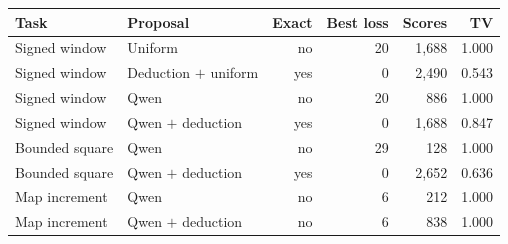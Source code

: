 \begin{tabular}{llrrrr}
\toprule
Task & Proposal & Exact & Best loss & Scores & TV \\
\midrule
Signed window & Uniform & no & 20 & 1,688 & 1.000 \\
Signed window & Deduction $+$ uniform & yes & 0 & 2,490 & 0.543 \\
Signed window & Qwen & no & 20 & 886 & 1.000 \\
Signed window & Qwen $+$ deduction & yes & 0 & 1,688 & 0.847 \\
Bounded square & Qwen & no & 29 & 128 & 1.000 \\
Bounded square & Qwen $+$ deduction & yes & 0 & 2,652 & 0.636 \\
Map increment & Qwen & no & 6 & 212 & 1.000 \\
Map increment & Qwen $+$ deduction & no & 6 & 838 & 1.000 \\
\bottomrule
\end{tabular}
